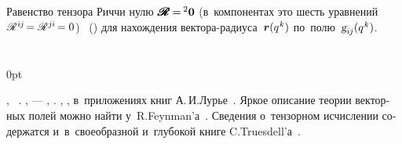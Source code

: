 \begin{otherlanguage}{russian}
Равенство тензора Риччи нулю
${\hspace{.1ex}\pmb{\scalebox{1.2}[1]{$\mathscr{R}$}} \hspace{-0.16ex} = \hspace{-0.2ex} {^2\bm{0}}}$ (в~компонентах это шесть уравнений ${\hspace{.1ex}\mathscr{R}^{\hspace{.1ex}i\hspace{-0.1ex}j} \hspace{-0.3ex} = \mathscr{R}^{\hspace{.1ex}j\hspace{-0.06ex}i} \hspace{-0.3ex} = 0}$)  \textcolor{magenta}{}  ~() для нахождения вектора-радиуса~${\bm{r}(q^{\hspace{.1ex}k})}$ по~полю~${\textsl{g}_{i\hspace{-0.1ex}j}(q^{\hspace{.1ex}k})}$.

\end{otherlanguage}

\section*{\small \wordforbibliography}

\begin{changemargin}{\parindent}{0pt}
\fontsize{10}{12}\selectfont

\begin{otherlanguage}{russian}

, ~\cite{mcconnell-tensoranalysis, schouten-tensoranalysis, sokolnikoff-tensoranalysis, borisenko.tarapov, rashevsky-riemanniangeometry}. ,  \:--- , .
  , , в~приложениях книг А.\,И.\;Лурье~\cite{lurie-nonlinearelasticity, lurie-theoryofelasticity}.
Яркое описание теории векторных полей можно найти у~R.\:Feynman’а~\cite{feynman-lecturesonphysics}.
Сведения о~тензорном исчислении содержатся и~в~своеобразной и~глубокой книге C.\:Truesdell’а~\cite{truesdell-firstcourse}.

\end{otherlanguage}

\end{changemargin}
